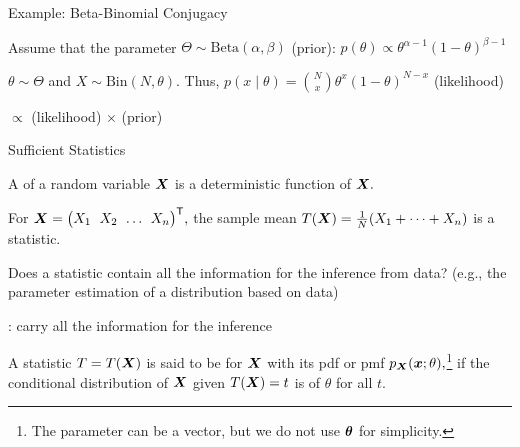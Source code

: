 \documentclass[handout,fleqn,aspectratio=169]{beamer}
\begin{document}
\begin{frame}{Example: Beta-Binomial Conjugacy} 

\plitemsep 0.1in

\bci 

\item Assume that the parameter $\Theta \sim \text{Beta}(\alpha,\beta)$ (prior): 
$
p(\theta) \propto \theta^{\alpha-1} (1-\theta)^{\beta -1}
$

\item $\theta \sim \Theta$ and $X \sim \text{Bin}(N,\theta).$ Thus, $\displaystyle p(x \mid \theta) = {N \choose x} \theta^x (1-\theta)^{N-x}$ (likelihood)

\item {} $\propto$ (likelihood) $\times$ (prior)
\eci
\end{frame}

\begin{frame}{Sufficient Statistics} 

\plitemsep 0.1in

\bci 

\item A  of a random variable $\bm{X}$ is a deterministic function of $\bm{X}.$

\item \exam For $\vX = \trans{\rowvec{X_1 & X_2 & \ldots & X_n}},$ the sample mean $T(\bm{X}) = \frac{1}{N}(X_1 + \cdots + X_n)$ is a statistic. 

\item \question Does a statistic contain all the information for the inference from data? (e.g., the parameter estimation of a distribution based on data)

\item {}: carry all the information for the inference

\item {} A statistic $T = T(\bm{X})$ is said to be  for $\bm{X}$ with its pdf or pmf $p_{\bm{X}}(\bm{x};\theta),$\footnote{The parameter can be a vector, but we do not use $\bm{\theta}$ for simplicity.} if the conditional distribution of $\bm{X}$ given $T(\bm{X})=t$ is  of $\theta$ for all $t.$
\eci
\end{frame}
\end{document}
